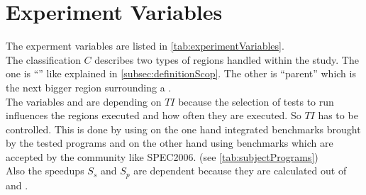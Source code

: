 \section{Experiment Variables}
The experment variables are listed in \autoref{tab:experimentVariables}.\\
The classification \(C\) describes two types of regions handled within the study.
The one is \enquote{\scop} like explained in \autoref{subsec:definitionScop}.
The other is \enquote{parent} which is the next bigger region surrounding a \scop.\\
The variables \dyncovs and \dyncovp are depending on \(TI\) because the selection of tests to run influences the regions executed and how often they are executed.
So \(TI\) has to be controlled.
This is done by using on the one hand integrated benchmarks brought by the tested programs and on the other hand using benchmarks which are accepted by the community like SPEC2006. (see \autoref{tab:subjectPrograms})\\
Also the speedups \(S_s\) and \(S_p\) are dependent because they are calculated out of \dyncovs and \dyncovp.
